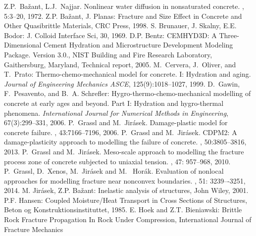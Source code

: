 \documentclass[a4paper]{article}
\begin{document}
\begin{thebibliography}{99}
 Z.P.~Ba\v{z}ant, L.J.~Najjar.
\newblock  Nonlinear water diffusion in nonsaturated concrete.
, 5:3--20, 1972.
 Z.P. Ba\v{z}ant, J. Planas: Fracture and Size
  Effect in Concrete and Other Quasibrittle  Materials, CRC Press,
  1998.
 S. Brunauer, J. Skalny, E.E. Bodor: J. Colloid Interface
  Sci, 30, 1969.
 D.P. Bentz: CEMHYD3D: A Three-Dimensional Cement Hydration and Microstructure Development Modeling Package. Version 3.0., NIST Building and Fire Research Laboratory, Gaithersburg, Maryland, Technical report, 2005.
 M.~Cervera, J.~Oliver, and T.~Prato: Thermo-chemo-mechanical model for concrete. I: Hydration and aging. {\em Journal of Engineering Mechanics ASCE}, 125(9):1018--1027, 1999.
 D.~Gawin, F.~Pesavento, and B.~A. Schrefler: Hygro-thermo-chemo-mechanical modelling of concrete at early ages and beyond. Part I: Hydration and hygro-thermal phenomena. {\em International Journal for Numerical Methods in Engineering}, 67(3):299--331, 2006.
 P.~Grassl and M.~Jir\'{a}sek.
\newblock Damage-plastic model for concrete failure.
, 43:7166--7196, 2006.
 P.~Grassl and M.~Jir\'{a}sek.
\newblock CDPM2: A damage-plasticity approach to modelling the failure of concrete.
, 50:3805--3816, 2013.
 P.~Grassl and M.~Jir\'{a}sek.
\newblock Meso-scale approach to modelling the fracture process zone of concrete subjected to uniaxial tension.
, 47: 957--968, 2010.
 P.~Grassl, D.~Xenos, M.~Jir\'{a}sek and M.~ Hor\'{a}k.
\newblock  Evaluation of nonlocal approaches for modelling fracture near nonconvex boundaries.
, 51: 3239–-3251, 2014.
 M. Jir\'asek, Z.P. Ba\v zant: Inelastic analysis of
  structures, John Wiley, 2001.
 P.F. Hansen: Coupled Moisture/Heat Transport in
  Cross Sections of Structures, Beton og Konstruktionsinstituttet, 1985.
 E. Hoek and Z.T. Bieniawski: Brittle Rock Fracture Propagation
In Rock Under Compression, International Journal of Fracture Mechanics

\end{thebibliography}
\end{document}
